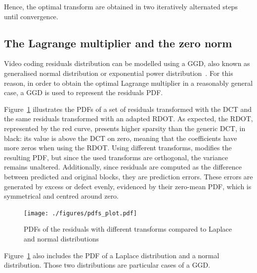 \documentclass[11pt,a4paper,openright,twoside]{book}
\def\usepdfs{1} %
\numberwithin{equation}{section} %
\numberwithin{figure}{section} %
\numberwithin{table}{section} %
\begin{document}
Hence, the optimal transform are obtained in two iteratively alternated steps
until convergence.

\subsection{The Lagrange multiplier and the zero norm}
\label{sub:the_lagrange_multiplier}

Video coding residuals distribution can be modelled using a \ac{GGD}, also
known as generalised normal distribution or exponential power
distribution~\cite{lam-00-dct-coefficient-distribution,
yovanof-96-analysis-dct-coefficients}.
For this reason, in order to obtain the optimal Lagrange multiplier in a
reasonably general case, a \ac{GGD} is used to represent the residuals
\ac{PDF}.

Figure~\ref{fig:probability_density_functions} illustrates the \acp{PDF}
of a set of residuals transformed with the \ac{DCT} and the same residuals
transformed with an adapted \ac{RDOT}.  As expected, the \ac{RDOT},
represented by the red curve, presents higher sparsity than the generic
\ac{DCT}, in black:
its value is above the \ac{DCT} on zero, meaning that the coefficients have
more zeros when using the \ac{RDOT}.
Using different transforms, modifies the resulting \ac{PDF}, but since the
used transforms are orthogonal, the variance remains unaltered.
Additionally, since residuals are computed as the difference between predicted
and original blocks, they are prediction errors.
These errors are generated by excess or defect evenly, evidenced by their
zero-mean \ac{PDF}, which is symmetrical and centred around zero.
\begin{figure}[tb]
	\centering
	\ifthenelse{\usepdfs = 0}
	{}
	{\texttt{[image: ./figures/pdfs\_plot.pdf]}}
	\caption[Different residuals \acsp{PDF} compared to Laplace and Normal
	distributions]
	{\acsp{PDF} of the residuals with different transforms
	compared to Laplace and normal distributions}
	\label{fig:probability_density_functions}
\end{figure}
Figure~\ref{fig:probability_density_functions} also includes the
\ac{PDF} of a Laplace distribution and a normal distribution.
Those two distributions are particular cases of a \ac{GGD}.
\end{document}
